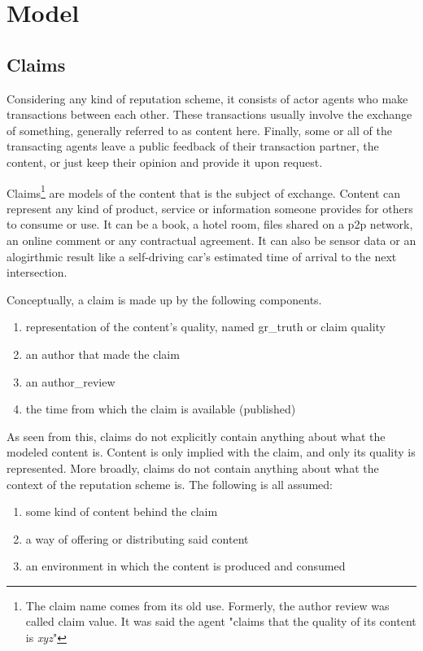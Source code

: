 \documentclass[%
    ]{\PathToTumTemplate/thesis/tum_thesis}
\begin{document}
\section{Model}\label{sec:approach_model}

\subsection{Claims}\label{sec:approach_claims}
Considering any kind of reputation scheme, it consists of actor agents who make transactions between each other.
These transactions usually involve the exchange of something, generally referred to as content here.
Finally, some or all of the transacting agents leave a public feedback of their transaction partner, the content, or just keep their opinion and provide it upon request.

Claims\footnote{The claim name comes from its old use. Formerly, the author review was called claim value. It was said the agent "claims that the quality of its content is \emph{xyz}"} are models of the content that is the subject of exchange.
Content can represent any kind of product, service or information someone provides for others to consume or use.
It can be a book, a hotel room, files shared on a \acrlong{p2p} network, an online comment or any contractual agreement.
It can also be sensor data or an alogirthmic result like a self-driving car's estimated time of arrival to the next intersection.

Conceptually, a claim is made up by the following components.
\begin{enumerate}
	\item representation of the content's quality, named \gls{gr_truth} or claim quality
	\item an author that made the claim
	\item an \gls{author_review}
	\item the time from which the claim is available (published)
\end{enumerate}

As seen from this, claims do not explicitly contain anything about what the modeled content is.
Content is only implied with the claim, and only its quality is represented.
More broadly, claims do not contain anything about what the context of the reputation scheme is.
The following is all assumed:
\begin{enumerate}
	\item some kind of content behind the claim
	\item a way of offering or distributing said content
	\item an environment in which the content is produced and consumed
\end{enumerate}
\end{document}
